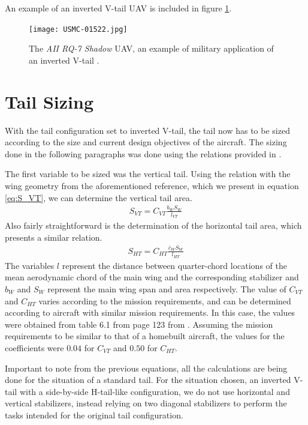 \documentclass[english,fira]{ist-report}
\begin{document}
An example of an inverted V-tail UAV is included in figure \ref{fig:rq7}.
\begin{figure}[ht]
	\centering
	\texttt{[image: USMC-01522.jpg]}
	\caption[The \textit{AII RQ-7 Shadow} UAV.]{The \textit{AII RQ-7 Shadow} UAV, an example of military application of an inverted V-tail \cite{olivedrab-rq7}.}
	\label{fig:rq7}
\end{figure}

\section{Tail Sizing}

With the tail configuration set to inverted V-tail, the tail now has to be sized according to the size and current design objectives of the aircraft. The sizing done in the following paragraphs was done using the relations provided in  \cite{corke}.

The first variable to be sized was the vertical tail. Using the relation with the wing geometry from the aforementioned reference, which we present in equation \ref{eq:S_VT}, we can determine the vertical tail area.
\begin{gather}\label{eq:S_VT}
	S_{VT} = C_{VT}\frac{b_WS_W}{l_{VT}}
\end{gather}
Also fairly straightforward is the determination of the horizontal tail area, which presents a similar relation.
\begin{gather}\label{eq:S_HT}
	S_{HT} = C_{HT}\frac{\bar{c}_WS_W}{l_{HT}}
\end{gather}
The variables $l$ represent the distance between quarter-chord locations of the mean aerodynamic chord of the main wing and the corresponding stabilizer and $b_W$ and $S_W$ represent the main wing span and area respectively. The value of $C_{VT}$ and $C_{HT}$ varies according to the mission requirements, and can be determined according to aircraft with similar mission requirements. In this case, the values were obtained from table 6.1 from page 123 from  \cite{corke}. Assuming the mission requirements to be similar to that of a homebuilt aircraft, the values for the coefficients were $0.04$ for $C_{VT}$ and $0.50$ for $C_{HT}$.

Important to note from the previous equations, all the calculations are being done for the situation of a standard tail. For the situation chosen, an inverted V-tail with a side-by-side H-tail-like configuration, we do not use horizontal and vertical stabilizers, instead relying on two diagonal stabilizers to perform the tasks intended for the original tail configuration.
\end{document}
